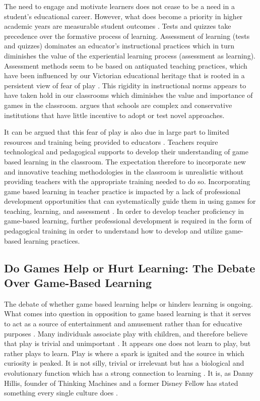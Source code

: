 \documentclass[10pt]{article}
\begin{document}
The need to engage and motivate learners does not cease to be a need in a student’s educational career. However, what does become a priority in higher academic years are measurable student outcomes \citep{ball2012politics,shore2010beyond,leather2021pedagogy}. Tests and quizzes take precedence over the formative process of learning. Assessment of learning (tests and quizzes) dominates an educator’s instructional practices which in turn diminishes the value of the experiential learning process (assessment as learning). Assessment methods seem to be based on antiquated teaching practices, which have been influenced by our Victorian educational heritage that is rooted in a persistent view of fear of play \citep{wood2013play}. This rigidity in instructional norms appears to have taken hold in our classrooms which diminishes the value and importance of games in the classroom. \citet{reich2020failure} argues that schools are complex and conservative institutions that have little incentive to adopt or test novel approaches. 

It can be argued that this fear of play is also due in large part to limited resources and training being provided to educators \citep{fishman2014empowering}. Teachers require technological and pedagogical supports to develop their understanding of game based learning in the classroom. The expectation therefore to incorporate new and innovative teaching methodologies in the classroom is unrealistic without providing teachers with the appropriate training needed to do so. Incorporating game based learning in teacher practice is impacted by a lack of professional development opportunities that can systematically guide them in using games for teaching, learning, and assessment \citep{fishman2014empowering,ruggiero2013video,foster2020principles}. In order to develop teacher proficiency in game-based learning, further professional development is required in the form of pedagogical training in order to understand how to develop and utilize game-based learning practices.


\subsection{Do Games Help or Hurt Learning: The Debate Over Game-Based Learning}

The debate of whether game based learning helps or hinders learning is ongoing. What comes into question in opposition to game based learning is that it serves to act as a source of entertainment and amusement rather than for educative purposes \citep{lister2015gamification, mayer2010adding}. Many individuals associate play with children, and therefore believe that play is trivial and unimportant \citep{prensky2001fun}. It appears one does not learn to play, but rather plays to learn. Play is where a spark is ignited and the source in which curiosity is peaked. It is not silly, trivial or irrelevant but has a biological and evolutionary function which has a strong connection to learning \citep{prensky2001fun}. It is, as Danny Hillis, founder of Thinking Machines and a former Disney Fellow has stated something every single culture does \citep{prensky2001fun}.
\end{document}
